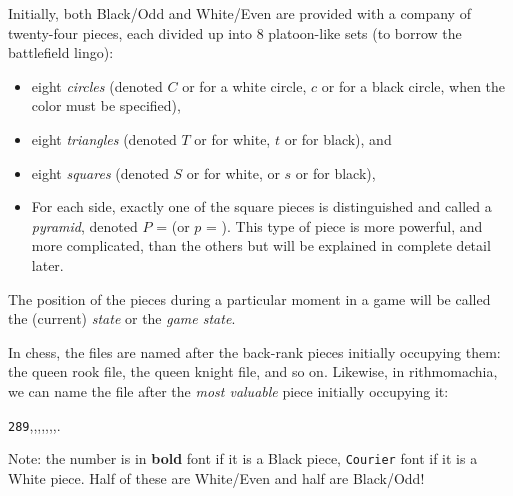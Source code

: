 \documentclass[14pt]{extarticle}
\begin{document}
Initially, both Black/Odd and White/Even are provided with a company of
twenty-four pieces, each divided up into $8$ platoon-like sets
(to borrow the battlefield lingo):
\begin{itemize}
\item
eight {\it circles} (denoted $C$ or {\circlet} for a white circle,
$c$ or {\circletfill} for a black circle,
when the color must be specified),
\item
eight {\it triangles} (denoted $T$ or {\trianglepa} for white, $t$ or
{\trianglepafill} for black), and
\item
eight {\it squares} (denoted $S$ or {\squad} for white, or $s$ or
{\squadfill} for black),
\item
For each side, exactly one of the square pieces is distinguished
and called a {\it pyramid}, denoted $P$ = {\rhombus} (or $p$ = \rhombusfill).
This type of piece is more powerful, and more complicated, than the
others but will be explained in complete detail later.
\end{itemize}
The position of the pieces during a particular moment in a game
will be called the (current) {\it state} or the {\it game state}.

In chess, the files are named after the back-rank pieces initially
occupying them:
the queen rook file, the queen knight file, and so on. Likewise, in
rithmomachia, we can name the file after the {\it most valuable} piece
initially occupying it:

\begin{center}
{\tt 289},,,,,,,.
\end{center}
Note: the number is in {\bf bold} font if it is a Black piece,
{\tt Courier} font if it is a White piece.
Half of these are White/Even and half are Black/Odd!

\end{document}
